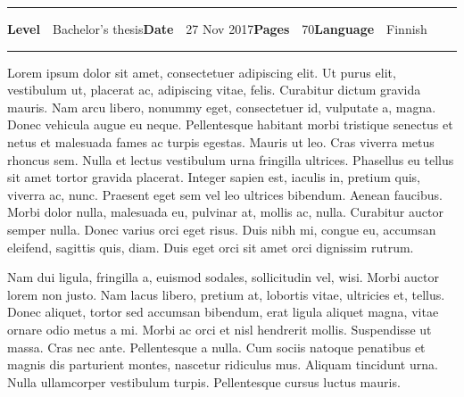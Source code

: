 \begin{spacing}{.88}
{\vspace{-2.4mm}\rule{\textwidth}{.75pt}

{\fontsize{10.5pt}{10.5pt}\bfseries\sffamily\lsstyle Level}~~{\small Bachelor's thesis}\hfill{\fontsize{10.5pt}{10.5pt}\bfseries\sffamily\lsstyle Date}~~{\small 27 Nov 2017}\hfill{\fontsize{10.5pt}{10.5pt}\bfseries\sffamily\lsstyle Pages}~~{\small 70}\hfill{\fontsize{10.5pt}{10.5pt}\bfseries\sffamily\lsstyle Language}~~{\small Finnish}

\vspace{-2.4mm}\rule{\textwidth}{.75pt}

\vspace{6mm}

} %
\end{spacing}
\begin{spacing}{1.05}

\vspace{.8mm}

{\small
  Lorem ipsum dolor sit amet, consectetuer adipiscing elit. Ut purus
  elit, vestibulum ut, placerat ac, adipiscing vitae, felis. Curabitur
  dictum gravida mauris. Nam arcu libero, nonummy eget, consectetuer
  id, vulputate a, magna. Donec vehicula augue eu neque. Pellentesque
  habitant morbi tristique senectus et netus et malesuada fames ac
  turpis egestas. Mauris ut leo. Cras viverra metus rhoncus sem. Nulla
  et lectus vestibulum urna fringilla ultrices. Phasellus eu tellus
  sit amet tortor gravida placerat. Integer sapien est, iaculis in,
  pretium quis, viverra ac, nunc. Praesent eget sem vel leo ultrices
  bibendum. Aenean faucibus. Morbi dolor nulla, malesuada eu, pulvinar
  at, mollis ac, nulla. Curabitur auctor semper nulla.  Donec varius
  orci eget risus. Duis nibh mi, congue eu, accumsan eleifend,
  sagittis quis, diam. Duis eget orci sit amet orci dignissim rutrum.

  Nam dui ligula, fringilla a, euismod sodales, sollicitudin vel,
  wisi. Morbi auctor lorem non justo. Nam lacus libero, pretium at,
  lobortis vitae, ultricies et, tellus. Donec aliquet, tortor sed
  accumsan bibendum, erat ligula aliquet magna, vitae ornare odio
  metus a mi. Morbi ac orci et nisl hendrerit mollis. Suspendisse ut
  massa. Cras nec ante. Pellentesque a nulla.  Cum sociis natoque
  penatibus et magnis dis parturient montes, nascetur ridiculus
  mus. Aliquam tincidunt urna. Nulla ullamcorper vestibulum
  turpis. Pellentesque cursus luctus mauris.

}
\end{spacing}
